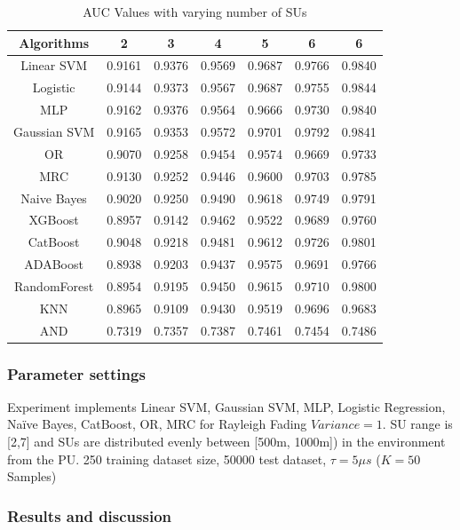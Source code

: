 \begin{table}
\centering
\caption{AUC Values with varying number of SUs }
    \begin{tabular}{||c c c c c c c||}
    \hline
    {\bf Algorithms} & {\bf 2} & {\bf 3} & {\bf 4} & {\bf 5} & {\bf 6} & {\bf 6} 			\\ \hline
    
    	Linear SVM 	& 0.9161	& 0.9376	& 0.9569	& 0.9687	& 0.9766	& 0.9840	\\ \hline
  	Logistic 		& 0.9144	& 0.9373	& 0.9567	& 0.9687	& 0.9755	& 0.9844	\\ \hline
  	MLP 			& 0.9162	& 0.9376	& 0.9564	& 0.9666	& 0.9730	& 0.9840	\\ \hline
  	Gaussian SVM 	& 0.9165	& 0.9353	& 0.9572	& 0.9701	& 0.9792	& 0.9841	\\ \hline
  	OR 			& 0.9070	& 0.9258	& 0.9454	& 0.9574	& 0.9669	& 0.9733	\\ \hline
  	MRC  			& 0.9130	& 0.9252	& 0.9446	& 0.9600	& 0.9703	& 0.9785	\\ \hline
  	Naive Bayes 	& 0.9020	& 0.9250	& 0.9490	& 0.9618	& 0.9749	& 0.9791	\\ \hline
  	XGBoost 		& 0.8957	& 0.9142	& 0.9462	& 0.9522	& 0.9689	& 0.9760	\\ \hline
  	CatBoost 		& 0.9048	& 0.9218	& 0.9481	& 0.9612	& 0.9726	& 0.9801	\\ \hline
  	ADABoost 		& 0.8938	& 0.9203	& 0.9437	& 0.9575	& 0.9691	& 0.9766	\\ \hline
  	RandomForest 	& 0.8954	& 0.9195	& 0.9450	& 0.9615	& 0.9710	& 0.9800	\\ \hline
  	KNN 			& 0.8965	& 0.9109	& 0.9430	& 0.9519	& 0.9696	& 0.9683	\\ \hline
  	AND 			& 0.7319	& 0.7357	& 0.7387	& 0.7461	& 0.7454	& 0.7486	\\ \hline
	\end{tabular}
\end{table} 

\subsubsection{Parameter settings}
Experiment implements Linear SVM, Gaussian SVM, MLP, Logistic Regression, Naïve Bayes, CatBoost, OR, MRC for Rayleigh Fading $Variance=1$. SU range is [2,7] and SUs are distributed evenly between [500m, 1000m]) in the environment from the PU. 250 training dataset size, 50000 test dataset, $\tau=5 \mu s$ ($K=50$ Samples)
\subsubsection{Results and discussion}

